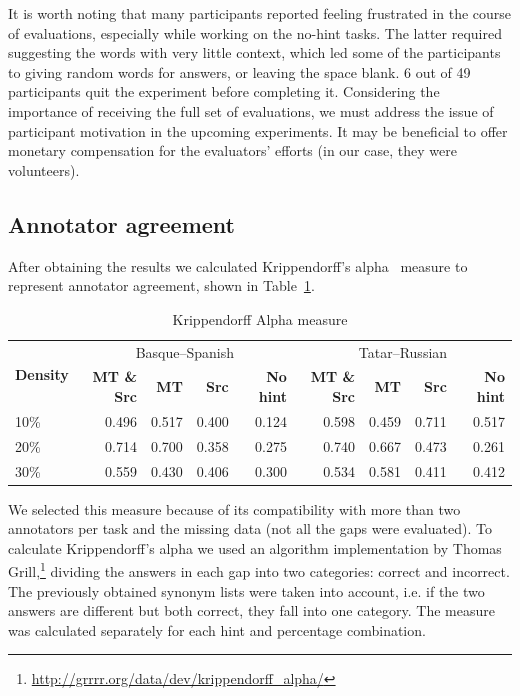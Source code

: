 \documentclass[11pt]{article}
\begin{document}
It is worth noting that many participants reported feeling frustrated in
the course of evaluations, especially while working on the no-hint tasks. The latter required suggesting the words with very little context, which led some of the participants to giving random words for answers, or leaving the space blank. 6 out of 49
participants quit the experiment before completing it. Considering the importance of receiving the full set of evaluations, we must address the issue of participant motivation in the upcoming experiments. It may be beneficial to offer monetary compensation for the evaluators' efforts (in our case, they were volunteers).

\subsection{Annotator agreement}
After obtaining the results we calculated Krippendorff's alpha~\citep{krippendorff70} measure to represent annotator agreement, shown in Table~\ref{table:alpha}. 
\begin{table}
\centering
  \begin{tabular}{|l|r|r|r|r|r|r|r|r|}
  \hline
 \multirow{2}{*}{\textbf{Density}} & \multicolumn{4}{|c|}{Basque--Spanish}&\multicolumn{4}{|c|}{Tatar--Russian} \\\cline{2-9}
                                            & \textbf{MT \& Src} & \textbf{MT} & \textbf{Src} & \textbf{No hint}& \textbf{MT \& Src} & \textbf{MT} & \textbf{Src} & \textbf{No hint} \\
\hline
10\%&0.496&0.517&0.400&0.124&0.598&0.459 &0.711 &0.517\\
20\%&0.714&0.700&0.358&0.275&0.740&0.667 &0.473 &0.261\\
30\%&0.559&0.430&0.406&0.300&0.534&0.581 &0.411 &0.412\\

\hline
\end{tabular}
\caption{Krippendorff Alpha measure} 
\label{table:alpha}
\end{table}

We selected this measure because of its compatibility with more than two annotators per task and the missing data (not all the gaps were evaluated). To calculate Krippendorff's alpha we used an algorithm implementation by Thomas Grill,\footnote{\url{http://grrrr.org/data/dev/krippendorff_alpha/}} dividing the answers in each gap into two categories: correct and incorrect. The previously obtained synonym lists were taken into account, i.e. if the two answers are different but both correct, they fall into one category. The measure was calculated separately for each hint and percentage combination.
\end{document}
